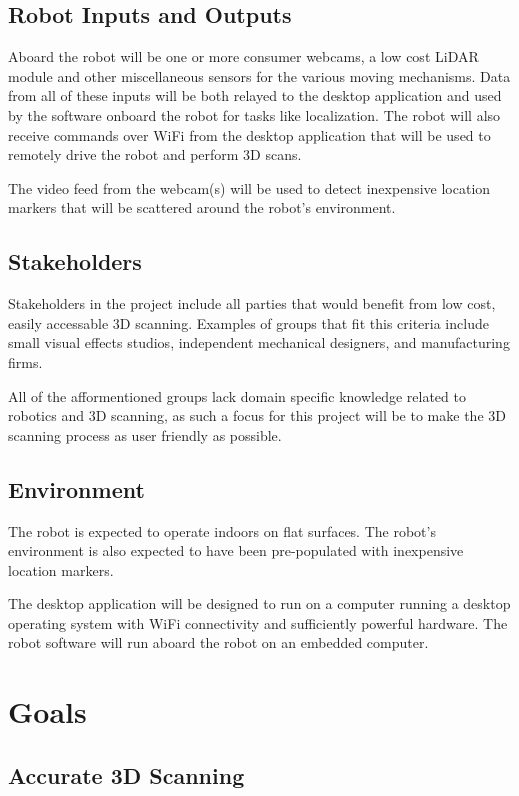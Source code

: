 \documentclass{article}
\begin{document}
\subsection{Robot Inputs and Outputs}

Aboard the robot will be one or more consumer webcams,
a low cost LiDAR module and other miscellaneous sensors
for the various moving mechanisms. Data from all of these inputs
will be both relayed to the desktop application and used by the
software onboard the robot for tasks like localization. The robot will also receive commands over WiFi from the desktop application
that will be used to remotely drive the robot and perform 3D scans.

The video feed from the webcam(s) will be used to detect inexpensive location markers that
will be scattered around the robot's environment. 

\subsection{Stakeholders}
Stakeholders in the project include all parties that would benefit from
low cost, easily accessable 3D scanning. Examples of groups that fit this
criteria include small visual effects studios, independent mechanical
designers, and manufacturing firms.

All of the afformentioned groups lack domain specific knowledge related to 
robotics and 3D scanning, as such a focus for this project will be to make the
3D scanning process as user friendly as possible. 

\subsection{Environment}
The robot is expected to operate indoors on flat surfaces.
The robot's environment is also expected to have been pre-populated with
inexpensive location markers.

The desktop application will be designed to run on a computer
running a desktop operating system with WiFi connectivity and
sufficiently powerful hardware. The robot software will run aboard the robot
on an embedded computer.

\section{Goals}
\subsection{Accurate 3D Scanning}
\end{document}
